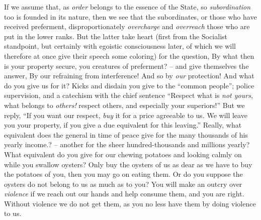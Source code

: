 \documentclass[12pt,a4paper]{book}
\begin{document}
If we assume that, as \textit{order} belongs to the essence of the State, so 
\textit{subordination} too is founded in its nature, then we see that the 
subordinates, or those who have received preferment, disproportionately 
\textit{overcharge} and \textit{overreach} those who are put in the lower 
ranks. But the latter take heart (first from the Socialist standpoint, but 
certainly with egoistic consciousness later, of which we will therefore at 
once give their speech some coloring) for the question, By what then is your 
property secure, you creatures of preferment? -- and give themselves the 
answer, By our refraining from interference! And so by \textit{our} 
protection! And what do you give us for it? Kicks and disdain you give to the 
``common people''; police supervision, and a catechism with the chief 
sentence ``Respect what is \textit{not yours}, what belongs to 
\textit{others!} respect others, and especially your superiors!'' But we 
reply, ``If you want our respect, \textit{buy} it for a price agreeable to 
us. We will leave you your property, if you give a due equivalent for this 
leaving.'' Really, what equivalent does the general in time of peace give for 
the many thousands of his yearly income.? -- another for the sheer 
hundred-thousands and millions yearly? What equivalent do you give for our 
chewing potatoes and looking calmly on while you swallow oysters? Only buy the 
oysters of us as dear as we have to buy the potatoes of you, then you may go 
on eating them. Or do you suppose the oysters do not belong to us as much as 
to you? You will make an outcry over \textit{violence} if we reach out our 
hands and help consume them, and you are right. Without violence we do not get 
them, as you no less have them by doing violence to us.
\end{document}
